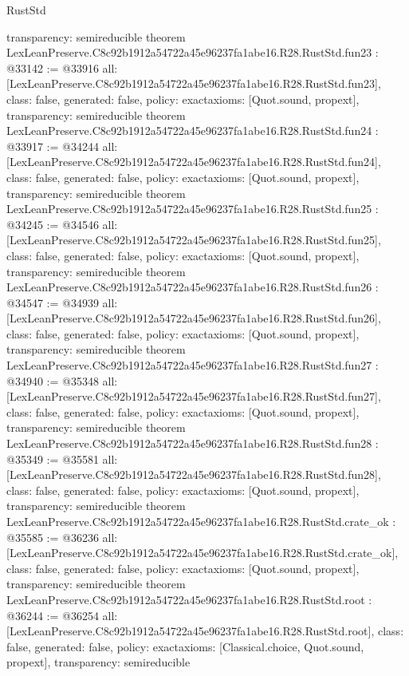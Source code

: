 \begin{lexlean}{RustStd}
\begin{coremodule}
{  transparency: semireducible
}
theorem LexLeanPreserve.C8c92b1912a54722a45e96237fa1abe16.R28.RustStd.fun23 : @33142 := @33916 {
  all: [LexLeanPreserve.C8c92b1912a54722a45e96237fa1abe16.R28.RustStd.fun23],
  class: false,
  generated: false,
  policy: exact{axioms: [Quot.sound, propext]},
  transparency: semireducible
}
theorem LexLeanPreserve.C8c92b1912a54722a45e96237fa1abe16.R28.RustStd.fun24 : @33917 := @34244 {
  all: [LexLeanPreserve.C8c92b1912a54722a45e96237fa1abe16.R28.RustStd.fun24],
  class: false,
  generated: false,
  policy: exact{axioms: [Quot.sound, propext]},
  transparency: semireducible
}
theorem LexLeanPreserve.C8c92b1912a54722a45e96237fa1abe16.R28.RustStd.fun25 : @34245 := @34546 {
  all: [LexLeanPreserve.C8c92b1912a54722a45e96237fa1abe16.R28.RustStd.fun25],
  class: false,
  generated: false,
  policy: exact{axioms: [Quot.sound, propext]},
  transparency: semireducible
}
theorem LexLeanPreserve.C8c92b1912a54722a45e96237fa1abe16.R28.RustStd.fun26 : @34547 := @34939 {
  all: [LexLeanPreserve.C8c92b1912a54722a45e96237fa1abe16.R28.RustStd.fun26],
  class: false,
  generated: false,
  policy: exact{axioms: [Quot.sound, propext]},
  transparency: semireducible
}
theorem LexLeanPreserve.C8c92b1912a54722a45e96237fa1abe16.R28.RustStd.fun27 : @34940 := @35348 {
  all: [LexLeanPreserve.C8c92b1912a54722a45e96237fa1abe16.R28.RustStd.fun27],
  class: false,
  generated: false,
  policy: exact{axioms: [Quot.sound, propext]},
  transparency: semireducible
}
theorem LexLeanPreserve.C8c92b1912a54722a45e96237fa1abe16.R28.RustStd.fun28 : @35349 := @35581 {
  all: [LexLeanPreserve.C8c92b1912a54722a45e96237fa1abe16.R28.RustStd.fun28],
  class: false,
  generated: false,
  policy: exact{axioms: [Quot.sound, propext]},
  transparency: semireducible
}
theorem LexLeanPreserve.C8c92b1912a54722a45e96237fa1abe16.R28.RustStd.crate_ok : @35585 := @36236 {
  all: [LexLeanPreserve.C8c92b1912a54722a45e96237fa1abe16.R28.RustStd.crate_ok],
  class: false,
  generated: false,
  policy: exact{axioms: [Quot.sound, propext]},
  transparency: semireducible
}
theorem LexLeanPreserve.C8c92b1912a54722a45e96237fa1abe16.R28.RustStd.root : @36244 := @36254 {
  all: [LexLeanPreserve.C8c92b1912a54722a45e96237fa1abe16.R28.RustStd.root],
  class: false,
  generated: false,
  policy: exact{axioms: [Classical.choice, Quot.sound, propext]},
  transparency: semireducible
}


\end{coremodule}
\end{lexlean}
